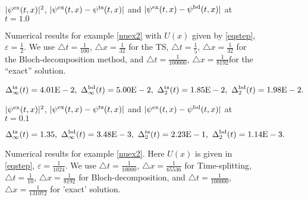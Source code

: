 \documentclass[leqno,final]{siamltex}
\numberwithin{equation}{section}
\newcounter{me}
\begin{document}
\begin{figure} \footnotesize
\begin{center}

$|\psi^{\rm ex}(t,x)|^2$, $|\psi^{\rm ex}(t,x)-\psi^{\rm
ts}(t,x)|$ and $|\psi^{\rm ex}(t,x)-\psi^{\rm bd}(t,x)|$ at
$t=1.0$\vspace{-1mm}
\caption{Numerical results for example
\ref{nuex2} with $U(x)$ given by \eqref{eqstep}, ${{\varepsilon }}={\frac{{1}}{{2}}}$. We
use ${\triangle} t={\frac{{1}}{{100}}}$, ${\triangle} x={\frac{{1}}{{32}}}$ for the TS, ${\triangle}
t={\frac{{1}}{{5}}}$, ${\triangle} x={\frac{{1}}{{32}}}$ for the Bloch-decomposition method,
and ${\triangle} t={\frac{{1}}{{100000}}}$, ${\triangle} x={\frac{{1}}{{8192}}}$for the ``exact''
solution. \vspace{-3mm}}\label{fig24}
\[\Delta^{\rm ts}_\infty(t)=4.01{\rm{E}}-2,\
\Delta^{\rm bd}_\infty(t)=5.00{\rm{E}}-2,\
\Delta^{\rm ts}_2(t)=1.85{\rm{E}}-2,\
\Delta^{\rm bd}_2(t)=1.98{\rm{E}}-2.\]\vspace{1mm}

\resizebox{1.5in}{!}{\texttt{[image: 2sa\_sp.eps]}}

$|\psi^{\rm ex}(t,x)|^2$, $|\psi^{\rm ex}(t,x)-\psi^{\rm ts}(t,x)|$
and $|\psi^{\rm ex}(t,x)-\psi^{\rm bd}(t,x)|$ at $t=0.1$\vspace{-1mm}
\end{center}
\caption{Numerical results for example \ref{nuex2}. Here
$U(x)$ is given in \eqref{eqstep}, ${{\varepsilon }}={\frac{{1}}{{1024}}}$.
We use ${\triangle} t={\frac{{1}}{{10000}}}$, ${\triangle} x={\frac{{1}}{{65536}}}$ for
Time-splitting,
${\triangle} t={\frac{{1}}{{10}}}$, ${\triangle} x={\frac{{1}}{{8192}}}$ for Bloch-decomposition,
and ${\triangle} t={\frac{{1}}{{100000}}}$, ${\triangle}
x={\frac{{1}}{{131072}}}$ for 'exact' solution.
}\label{fig26}\vspace{-3mm}
\[\Delta^{\rm ts}_\infty(t)=1.35,\
\Delta^{\rm bd}_\infty(t)=3.48{\rm{E}}-3,\
\Delta^{\rm ts}_2(t)=2.23{\rm{E}}-1,\
\Delta^{\rm bd}_2(t)=1.14{\rm{E}}-3.\]
\end{figure}
\end{document}
